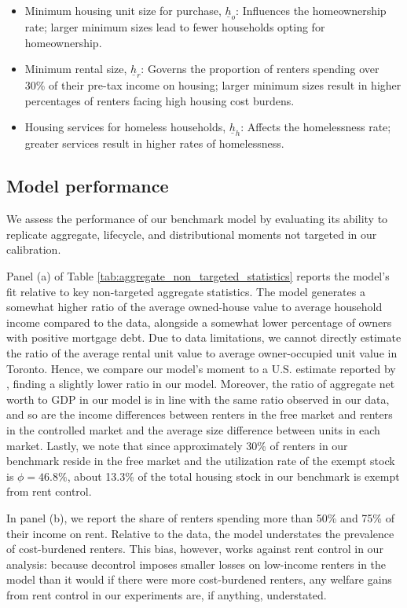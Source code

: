 \documentclass[parskip=full]{article}
\begin{document}
\begin{itemize}
    \item Minimum housing unit size for purchase, $\underline{h}_{o}$: Influences the homeownership rate; larger minimum sizes lead to fewer households opting for homeownership.
    \item Minimum rental size, $\underline{h}_{r}$: Governs the proportion of renters spending over 30\% of their pre-tax income on housing; larger minimum sizes result in higher percentages of renters facing high housing cost burdens.
    \item Housing services for homeless households, $\underline{h}_{h}$: Affects the homelessness rate; greater services result in higher rates of homelessness.
\end{itemize}

\subsection{Model performance}\label{sec:non_targeted_statistics}

We assess the performance of our benchmark model by evaluating its ability to replicate aggregate, lifecycle, and distributional moments not targeted in our calibration. 

Panel (a) of Table \ref{tab:aggregate_non_targeted_statistics} reports the model's fit relative to key non-targeted aggregate statistics. The model generates a somewhat higher ratio of the average owned-house value to average household income compared to the data, alongside a somewhat lower percentage of owners with positive mortgage debt. Due to data limitations, we cannot directly estimate the ratio of the average rental unit value to average owner-occupied unit value in Toronto. Hence, we compare our model's moment to a U.S. estimate reported by \citet{chatterjee-eyigungor-2015}, finding a slightly lower ratio in our model. Moreover, the ratio of aggregate net worth to GDP in our model is in line with the same ratio observed in our data, and so are the income differences between renters in the free market and renters in the controlled market and the average size difference between units in each market. Lastly, we note that since approximately 30\% of renters in our benchmark reside in the free market and the utilization rate of the exempt stock is $\phi=46.8\%$, about 13.3\% of the total housing stock in our benchmark is exempt from rent control.

In panel (b), we report the share of renters spending more than 50\% and 75\% of their income on rent. Relative to the data, the model understates the prevalence of cost-burdened renters. This bias, however, works against rent control in our analysis: because decontrol imposes smaller losses on low-income renters in the model than it would if there were more cost-burdened renters, any welfare gains from rent control in our experiments are, if anything, understated.
\end{document}
